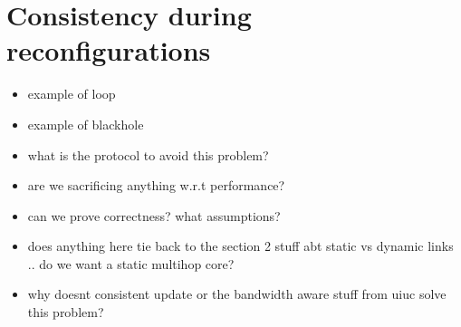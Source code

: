 \section{Consistency during reconfigurations}

\begin{itemize}

\item example of loop

\item example of blackhole

\item what is the protocol to avoid this problem?

\item are we sacrificing anything w.r.t performance?

\item can we prove correctness? what assumptions? 

\item does anything here tie back to the section 2 stuff abt 
 static vs dynamic links .. do we want a static multihop core?

\item why doesnt consistent update or the bandwidth aware stuff from uiuc 
 solve this problem?
\end{itemize}
